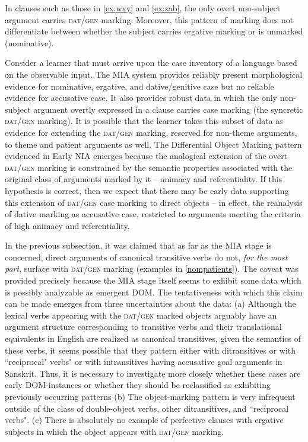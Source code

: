 \documentclass[output=paper,
modfonts
]{LSP/langsci}
\begin{document}
In clauses such as those  in \cref{ex:wxy} and \cref{ex:zab},  the only overt non-subject argument carries \textsc{dat/gen} marking. Moreover, this pattern of marking does not differentiate between whether the subject carries ergative marking or is unmarked (nominative). 

Consider a learner that must   arrive upon  the case inventory of a language based on the observable input. The MIA system provides reliably present morphological evidence   for nominative,  ergative, and dative/genitive case but no reliable evidence for accusative case. It also provides robust data in which the only non-subject argument overtly expressed in a clause carries case marking (the syncretic \textsc{dat/gen} marking). It is possible that the learner takes this subset of data as evidence for extending the \textsc{dat/gen} marking, reserved for  non-theme arguments, to theme and patient arguments as well. The Differential Object Marking pattern evidenced in Early NIA emerges because  the analogical extension of the overt \textsc{dat/gen}  marking is constrained by the semantic properties associated with the original class of arguments marked by it -- animacy and referentiality.
If this hypothesis is correct, then we expect that there may be early data supporting this extension of \textsc{dat/gen} case marking to direct objects -- in effect, the reanalysis of dative marking  as accusative case, restricted to arguments meeting the criteria of high animacy and referentiality.


In the previous subsection, it was claimed that    as far as the MIA stage is concerned,  direct arguments of canonical transitive verbs do not, \textit{for the most part}, surface with  \textsc{dat/gen} marking (examples in \cref{nompatients}). The caveat was provided precisely because the MIA stage itself seems to exhibit some  data which is possibly analyzable as emergent DOM. The tentativeness with which this claim can be made emerges from three uncertainties about the data: (a) Although the lexical verbs appearing with the \textsc{dat/gen} marked objects arguably have an argument structure corresponding to transitive verbs and their translational equivalents in English are realized as  canonical transitives, given the semantics of these verbs,  it seems possible that they pattern either with ditransitives or with ``reciprocal" verbs" or with intransitives having accusative goal arguments in Sanskrit. Thus, it is necessary to investigate more closely whether these cases are early DOM-instances or whether they should be reclassified as exhibiting previously occurring patterns (b) The object-marking pattern   is very infrequent outside of the class of double-object verbs, other ditransitives, and ``reciprocal verbs". (c) There is absolutely no example of perfective clauses with ergative subjects in which the object appears with \textsc{dat/gen} marking. 
\end{document}
